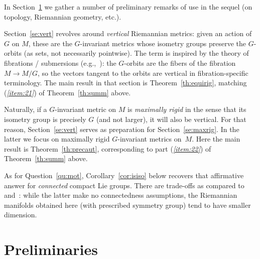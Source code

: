 \documentclass[10pt,a4paper]{amsart}
\numberwithin{equation}{section}
\begin{document}
In Section~\ref{se:prel} we gather a number of preliminary remarks of use in the sequel (on topology, Riemannian geometry, etc.).

Section~\ref{se:vert} revolves around {\it vertical} Riemannian metrics: given an action of $G$ on $M$, these are the $G$-invariant metrics whose isometry groups preserve the $G$-orbits (as sets, not necessarily pointwise). The term is inspired by the theory of fibrations / submersions (e.g.,~\cite[Chapter~9]{bes}): the $G$-orbits are the fibers of the fibration $M\to M/G$, so the vectors tangent to the orbits are vertical in fibration-specific terminology. The main result in that section is Theorem~\ref{th:equirig}, matching ({\it \ref{item:21}}) of Theorem~\ref{th:summ} above.

Naturally, if a $G$-invariant metric on $M$ is {\it maximally rigid} in the sense that its isometry group is precisely $G$ (and not larger), it will also be vertical. For that reason, Section~\ref{se:vert} serves as preparation for Section~\ref{se:maxrig}. In the latter we focus on maximally rigid $G$-invariant metrics on~$M$. Here the main result is Theorem~\ref{th:precaut}, corresponding to part ({\it\ref{item:22}}) of Theorem~\ref{th:summ} above.

As for Question~\ref{qu:mot}, Corollary~\ref{cor:isiso} below recovers that affirmative answer for {\it connected} compact Lie groups. There are trade-offs as compared to~\cite[Theorem~3]{bd} and~\cite[Theorem~1]{sz}: while the latter make no connectedness assumptions, the Riemannian manifolds obtained here (with prescribed symmetry group) tend to have smaller dimension.

\section{Preliminaries}\label{se:prel}
\end{document}
